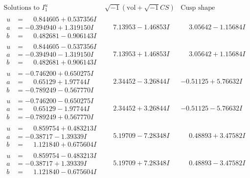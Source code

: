 \documentclass[1p]{elsarticle_modified}
\theoremstyle{definition}
\newcommand{\I}{\sqrt{-1}}
\begin{document}
$$\begin{array}{c|c|c}  
\text{Solutions to }I^u_{1}& \I (\text{vol} + \sqrt{-1}CS) & \text{Cusp shape}\\
 \hline 
\begin{aligned}
u &= \phantom{-}0.844605 + 0.537356 I \\
a &= -0.394940 + 1.319150 I \\
b &= \phantom{-}0.482681 - 0.906143 I\end{aligned}
 & \phantom{-}7.13953 - 1.46853 I & \phantom{-}3.05642 - 1.15684 I \\ \hline\begin{aligned}
u &= \phantom{-}0.844605 - 0.537356 I \\
a &= -0.394940 - 1.319150 I \\
b &= \phantom{-}0.482681 + 0.906143 I\end{aligned}
 & \phantom{-}7.13953 + 1.46853 I & \phantom{-}3.05642 + 1.15684 I \\ \hline\begin{aligned}
u &= -0.746200 + 0.650275 I \\
a &= \phantom{-}0.65129 + 1.97744 I \\
b &= -0.789249 - 0.567770 I\end{aligned}
 & \phantom{-}2.34452 - 3.26844 I & -0.51125 + 5.76632 I \\ \hline\begin{aligned}
u &= -0.746200 - 0.650275 I \\
a &= \phantom{-}0.65129 - 1.97744 I \\
b &= -0.789249 + 0.567770 I\end{aligned}
 & \phantom{-}2.34452 + 3.26844 I & -0.51125 - 5.76632 I \\ \hline\begin{aligned}
u &= \phantom{-}0.859754 + 0.483213 I \\
a &= -0.38717 - 1.39339 I \\
b &= \phantom{-}1.121840 + 0.675604 I\end{aligned}
 & \phantom{-}5.19709 - 7.28348 I & \phantom{-}0.48893 + 3.47582 I \\ \hline\begin{aligned}
u &= \phantom{-}0.859754 - 0.483213 I \\
a &= -0.38717 + 1.39339 I \\
b &= \phantom{-}1.121840 - 0.675604 I\end{aligned}
 & \phantom{-}5.19709 + 7.28348 I & \phantom{-}0.48893 - 3.47582 I \\ \hline\begin{aligned}

\end{aligned}
\end{array}$$
\end{document}
